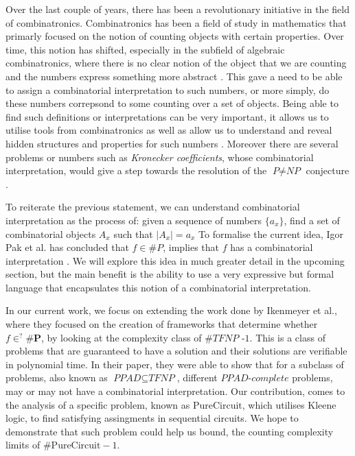 Over the last couple of years, there has been a revolutionary
initiative in the field of combinatronics.
Combinatronics has been a field of study in mathematics that primarly focused on
the notion of counting objects with certain properties. Over time, this notion
has shifted, especially in the subfield of algebraic combinatronics, where
there is no clear notion of the object that we are counting
and the numbers express something more abstract \cite{pakWhatCombinatorialInterpretation2022}. %
This gave a need to be able to assign a combinatorial interpretation to such numbers, or
more simply, do these numbers correpsond to some counting over a set of objects.
Being able to find such definitions or interpretations can be very important,
it allows us to utilise tools from combinatronics as well as allow us to understand
and reveal hidden structures and properties for such numbers \cite{pakWhatCombinatorialInterpretation2022}. 
Moreover there are several problems or numbers such as \textit{Kronecker coefficients},
whose combinatorial interpretation, would give a step towards the resolution of the $\textit{P} \neq \textit{NP}$
conjecture \cite{ikenmeyerWhatWhatNot2022a}.


To reiterate the previous statement, we can understand combinatorial interpretation as
the process of: given a sequence of numbers $\{a_x\}$,
find a set of combinatorial objects $A_x$ such that $|A_x| = a_x$
To formalise the current idea, Igor Pak et al. has concluded that
$f \in \textit{\#P}$, implies that $f$ has a combinatorial interpretation
\cite{pakWhatCombinatorialInterpretation2022, ikenmeyerWhatWhatNot2022a}.
We will explore this idea in much greater detail in the upcoming section,
but the main benefit is the ability to use a very expressive but formal language
that encapsulates this notion of a combinatorial interpretation.


In our current work, we focus on extending the work done by
Ikenmeyer et al., where they focused on the creation of frameworks
that determine whether $f \in^? \textbf{\#P}$, by looking
at the complexity class of $\textbf{\#}\textit{TFNP -1}$.
This is a class of problems that are guaranteed to have a solution
and their solutions are verifiable in polynomial time.
In their paper, they were able to show that for a subclass of
problems, also known as $\textit{PPAD} \subseteq \textit{TFNP}$,
different $\textit{PPAD-complete}$ problems, may or may not have a combinatorial
interpretation. Our contribution, comes to the analysis of a specific
problem, known as $\text{PureCircuit}$, which utilises
Kleene logic, to find satisfying assingments in sequential circuits.
We hope to demonstrate that such problem could help us bound, the
counting complexity limits of $\textbf{\#}\text{PureCircuit} -1$.

